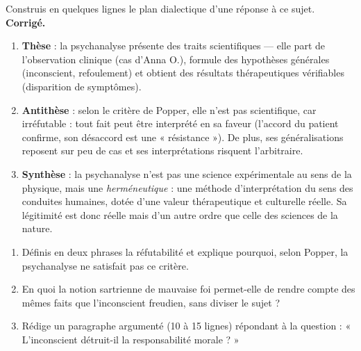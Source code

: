 \documentclass[11pt]{article}
\newcommand{\cle}[1]{{\popxbold\color{popdark}#1}}
\begin{document}
\begin{exoresolu}
Construis en quelques lignes le plan dialectique d'une réponse à ce sujet.
\tcblower
\textbf{Corrigé.}
\begin{enumerate}
\item \textbf{Thèse} : la psychanalyse présente des traits scientifiques — elle part de l'observation clinique (cas d'Anna O.), formule des hypothèses générales (inconscient, refoulement) et obtient des résultats thérapeutiques vérifiables (disparition de symptômes).
\item \textbf{Antithèse} : selon le critère de Popper, elle n'est pas scientifique, car irréfutable : tout fait peut être interprété en sa faveur (l'accord du patient confirme, son désaccord est une « résistance »). De plus, ses généralisations reposent sur peu de cas et ses interprétations risquent l'arbitraire.
\item \textbf{Synthèse} : la psychanalyse n'est pas une science expérimentale au sens de la physique, mais une \emph{herméneutique} : une méthode d'interprétation du sens des conduites humaines, dotée d'une valeur thérapeutique et culturelle réelle. Sa légitimité est donc réelle mais d'un autre ordre que celle des sciences de la nature.
\end{enumerate}
\end{exoresolu}

\begin{exercice}
\begin{enumerate}
\item Définis en deux phrases la \cle{réfutabilité} et explique pourquoi, selon Popper, la psychanalyse ne satisfait pas ce critère.
\item En quoi la notion sartrienne de \cle{mauvaise foi} permet-elle de rendre compte des mêmes faits que l'inconscient freudien, sans diviser le sujet ?
\item Rédige un paragraphe argumenté (10 à 15 lignes) répondant à la question : « L'inconscient détruit-il la responsabilité morale ? »
\end{enumerate}
\end{exercice}
\end{document}
